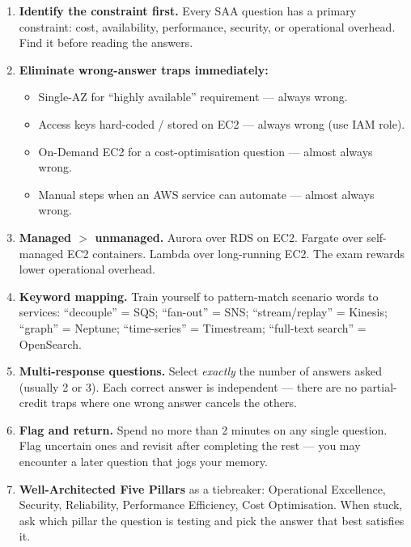 \begin{examtip}[title={[!] SAA-C03 Exam Tips}]
\begin{enumerate}
  \item \textbf{Identify the constraint first.} Every SAA question has a primary constraint:
        cost, availability, performance, security, or operational overhead. Find it before
        reading the answers.
  \item \textbf{Eliminate wrong-answer traps immediately:}
        \begin{itemize}
          \item Single-AZ for ``highly available'' requirement --- always wrong.
          \item Access keys hard-coded / stored on EC2 --- always wrong (use IAM role).
          \item On-Demand EC2 for a cost-optimisation question --- almost always wrong.
          \item Manual steps when an AWS service can automate --- almost always wrong.
        \end{itemize}
  \item \textbf{Managed $>$ unmanaged.} Aurora over RDS on EC2. Fargate over self-managed
        EC2 containers. Lambda over long-running EC2. The exam rewards lower operational overhead.
  \item \textbf{Keyword mapping.} Train yourself to pattern-match scenario words to services:
        ``decouple'' = SQS; ``fan-out'' = SNS; ``stream/replay'' = Kinesis; ``graph'' = Neptune;
        ``time-series'' = Timestream; ``full-text search'' = OpenSearch.
  \item \textbf{Multi-response questions.} Select \emph{exactly} the number of answers asked
        (usually 2 or 3). Each correct answer is independent --- there are no partial-credit traps
        where one wrong answer cancels the others.
  \item \textbf{Flag and return.} Spend no more than 2 minutes on any single question.
        Flag uncertain ones and revisit after completing the rest --- you may encounter
        a later question that jogs your memory.
  \item \textbf{Well-Architected Five Pillars} as a tiebreaker: Operational Excellence,
        Security, Reliability, Performance Efficiency, Cost Optimisation. When stuck,
        ask which pillar the question is testing and pick the answer that best satisfies it.
\end{enumerate}
\end{examtip}
